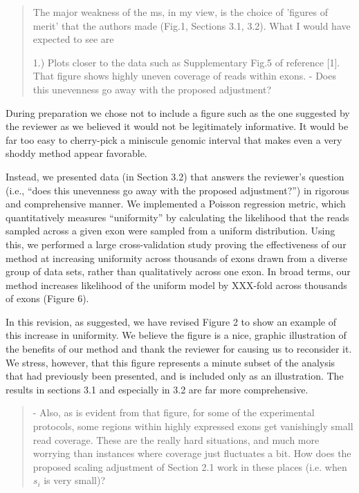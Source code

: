 \documentclass{article}
\begin{document}
\begin{quote}
The major weakness of the ms, in my view, is the choice of 'figures of
merit' that the authors made (Fig.1, Sections 3.1, 3.2). What I would
have expected to see are

1.) Plots closer to the data such as Supplementary Fig.5 of
reference [1]. That figure shows highly uneven coverage of reads
within exons.
- Does this unevenness go away with the proposed adjustment?
\end{quote}

During preparation we chose not to include a figure such as the one suggested
by the reviewer as we believed it would not be legitimately informative. It
would be far too easy to cherry-pick a miniscule genomic interval that makes
even a very shoddy method appear favorable.

Instead, we presented data (in Section 3.2) that answers the
reviewer's question (i.e., ``does this unevenness go away with the
proposed adjustment?'') in rigorous and comprehensive manner. We
implemented a Poisson regression metric, which quantitatively measures
``uniformity'' by calculating the likelihood that the reads sampled
across a given exon were sampled from a uniform distribution.  Using
this, we performed a large cross-validation study proving the
effectiveness of our method at increasing uniformity across thousands
of exons drawn from a diverse group of data sets, rather than
qualitatively across one exon.  In broad terms, our method increases
likelihood of the uniform model by XXX-fold across thousands of exons
(Figure 6).

In this revision, as suggested, we have revised Figure 2 to show an
example of this increase in uniformity.  We believe the figure is a
nice, graphic illustration of the benefits of our method and thank the
reviewer for causing us to reconsider it.  We stress, however, that
this figure represents a minute subset of the analysis that had
previously been presented, and is included only as an illustration.
The results in sections 3.1 and especially in 3.2 are far more
comprehensive.

\begin{quote}
- Also, as is evident from that figure, for some of the experimental
protocols, some regions within highly expressed exons get vanishingly
small read coverage.  These are the really hard situations, and much
more worrying than instances where coverage just fluctuates a bit.
How does the proposed scaling adjustment of Section 2.1 work in these
places (i.e. when $s_{i}$ is very small)?
\end{quote}
\end{document}

